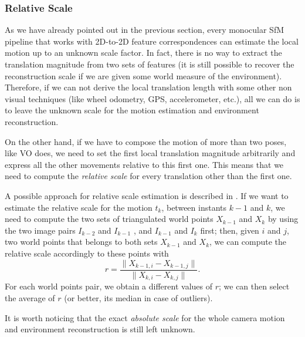 \subsubsection{Relative Scale}
As we have already pointed out in the previous section, every monocular SfM 
pipeline that works with 2D-to-2D feature correspondences can estimate the 
local motion up to an unknown scale factor. In fact, there is no way to extract 
the translation magnitude from two sets of features (it is still possible 
to recover the reconstruction scale if we are given some world measure of the
environment).
Therefore, if we can not derive the local translation length with some other
non visual techniques (like wheel odometry, GPS, accelerometer, etc.), 
all we can do is to leave the unknown scale for the motion estimation and 
environment reconstruction.

On the other hand, if we have to compose the motion of more than two poses, 
like VO does, we need to set the first local translation magnitude 
arbitrarily and express all the other movements relative to this first one.
This means that we need to compute the \textit{relative scale}
for every translation other than the first one.

A possible approach for relative scale estimation is described in 
\cite{scaramuzzaVisualOdometryI}. If we want to estimate the relative scale for 
the motion $t_k$, between instants $k-1$ and $k$, we need to compute the 
two sets of triangulated world points $X_{k-1}$ and $X_{k}$ by using 
the two image pairs $I_{k-2}$ and $I_{k-1}$ , and  $I_{k-1}$ and  $I_{k}$ first; then,
given $i$ and $j$, two world points that belongs to both sets $X_{k-1}$ and 
$X_{k}$, we can compute the relative scale accordingly to these points with
\begin{equation}
	\label{eq:relative_scale}
	r = \frac{\| X_{k-1, i} - X_{k - 1, j} \|}{\| X_{k, i} - X_{k, j} \|}
	\text{.}
\end{equation}
\noindent For each world points pair, we obtain a different values of $r$;
we can then select the average of $r$ (or better, its median in case of 
outliers).

It is worth noticing that the exact \textit{absolute scale} for the whole 
camera motion and environment reconstruction is still left unknown.

